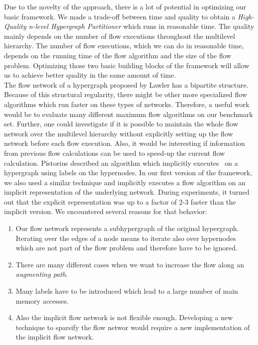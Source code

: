 Due to the novelty of the approach, there is a lot of potential in optimizing our basic 
framework. We made a trade-off between time and quality to obtain a \emph{High-Quality 
n-level Hypergraph Partitioner} which runs in reasonable time. The quality mainly depends
on the number of flow executions throughout the multilevel hierarchy. The number of flow
executions, which we can do in reasonable time, depends on the running time of the 
flow algorithm and the size of the flow problem. Optimizing those two basic building 
blocks of the framework will allow us to achieve better quality in the same amount of time.\\
The flow network of a hypergraph proposed by Lawler \cite{lawler1973} has a bipartite 
structure. Because of this structural regularity, there might be other more specialized
flow algorithms which run faster on these types of networks. Therefore, a useful work 
would be to evaluate many different maximum flow algorithms on our benchmark set. Further,
one could investigate if it is possible to maintain the whole flow network over the
multilevel hierarchy without explicitly setting up the flow network before each flow
execution. Also, it would be interesting if information from previous flow calculations can 
be used to speed-up the current flow calculation. Pistorius \cite{pistorius2003} described
an algorithm which implicitly executes \EdmondKarp~on a hypergraph using
labels on the hypernodes. In our first version of the framework, we also used a similar 
technique and implicitly executes a flow algorithm on an implicit representation of 
the underlying network. During experiments, it turned out that the explicit representation
was up to a factor of $2$-$3$ faster than the implicit version. We encountered several reasons
for that behavior: 
\begin{enumerate}
\item Our flow network represents a subhypergraph of the original hypergraph. Iterating 
      over the edges of a node means to iterate also over hypernodes which are not part of 
      the flow problem and therefore have to be ignored.
\item There are many different cases when we want to increase the flow along an 
      \emph{augmenting path}.
\item Many labels have to be introduced which lead to a large number of 
      main memory accesses.
\item Also the implicit flow network is not flexible enough. Developing a new 
      technique to sparsify the flow networ would require a new implementation of 
      the implicit flow network.
\end{enumerate}
